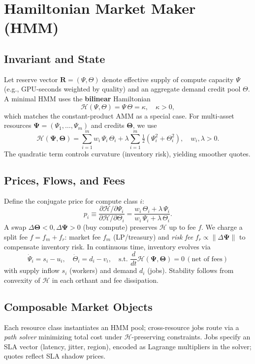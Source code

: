 \section{Hamiltonian Market Maker (HMM)}
\subsection{Invariant and State}
Let reserve vector \(\bm R = (\Psi, \Theta)\) denote effective supply of compute capacity \(\Psi\) (e.g., GPU-seconds weighted by quality) and an aggregate demand credit pool \(\Theta\). A minimal HMM uses the \textbf{bilinear} Hamiltonian
\begin{equation}\label{eq:cpmm}
\mathcal H(\Psi,\Theta) = \Psi\,\Theta = \kappa, \quad \kappa>0,
\end{equation}
which matches the constant-product AMM as a special case. For multi-asset resources \(\bm \Psi=(\Psi_1,\dots,\Psi_m)\) and credits \(\bm \Theta\), we use
\begin{equation}
\mathcal H(\bm\Psi,\bm\Theta) = \sum_{i=1}^m w_i\,\Psi_i\,\Theta_i + \lambda \sum_{i=1}^m \tfrac{1}{2}(\Psi_i^2+\Theta_i^2), \quad w_i,\lambda>0.
\end{equation}
The quadratic term controls curvature (inventory risk), yielding smoother quotes.

\subsection{Prices, Flows, and Fees}
Define the conjugate price for compute class \(i\):
\begin{equation}
 p_i \equiv \frac{\partial \mathcal H/\partial \Psi_i}{\partial \mathcal H/\partial \Theta_i} = \frac{w_i\,\Theta_i + \lambda\,\Psi_i}{w_i\,\Psi_i + \lambda\,\Theta_i}.
\end{equation}
A swap \(\Delta\bm\Theta<0, \Delta\bm\Psi>0\) (buy compute) preserves \(\mathcal H\) up to fee \(f\). We charge a split fee \(f=f_m+f_r\): market fee \(f_m\) (LP/treasury) and \emph{risk fee} \(f_r\propto \|\Delta\bm\Psi\|\) to compensate inventory risk. In continuous time, inventory evolves via
\begin{equation}
\dot{\Psi}_i = s_i - u_i,\quad \dot{\Theta}_i = d_i - v_i,\quad \text{s.t. } \frac{d}{dt}\mathcal H(\bm\Psi,\bm\Theta)=0 \, (\text{net of fees})
\end{equation}
with supply inflow \(s_i\) (workers) and demand \(d_i\) (jobs). Stability follows from convexity of \(\mathcal H\) in each orthant and fee dissipation.

\subsection{Composable Market Objects}
Each resource class instantiates an HMM pool; cross-resource jobs route via a \emph{path solver} minimizing total cost under \(\mathcal H\)-preserving constraints. Jobs specify an SLA vector (latency, jitter, region), encoded as Lagrange multipliers in the solver; quotes reflect SLA shadow prices.
